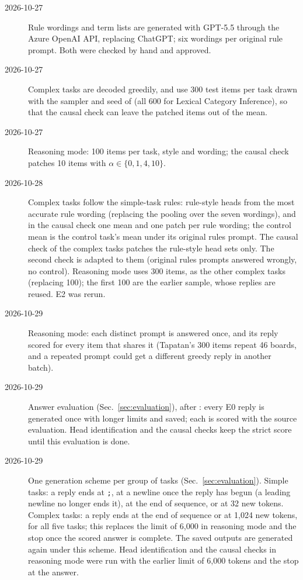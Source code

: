 \documentclass[11pt,a4paper]{article}
\begin{document}
\begin{description}
\item[2026-10-27] Rule wordings and term lists are generated with GPT-5.5 through the Azure OpenAI API, replacing ChatGPT; six wordings per original rule prompt. Both were checked by hand and approved.
\item[2026-10-27] Complex tasks are decoded greedily, and use 300 test items per task drawn with the sampler and seed of \citet{fu2026rules} (all 600 for Lexical Category Inference), so that the causal check can leave the patched items out of the mean.
\item[2026-10-27] Reasoning mode: 100 items per task, style and wording; the causal check patches 10 items with $\alpha\in\{0,1,4,10\}$.
\item[2026-10-28] Complex tasks follow the simple-task rules: rule-style heads from the most accurate rule wording (replacing the pooling over the seven wordings), and in the causal check one mean and one patch per rule wording; the control mean is the control task's mean under its original rules prompt. The causal check of the complex tasks patches the rule-style head sets only. The second check is adapted to them (original rules prompts answered wrongly, no control). Reasoning mode uses 300 items, as the other complex tasks (replacing 100); the first 100 are the earlier sample, whose replies are reused. E2 was rerun.
\item[2026-10-29] Reasoning mode: each distinct prompt is answered once, and its reply scored for every item that shares it (Tapatan's 300 items repeat 46 boards, and a repeated prompt could get a different greedy reply in another batch).
\item[2026-10-29] Answer evaluation (Sec.~\ref{sec:evaluation}), after \citet{hua2025flaw}: every E0 reply is generated once with longer limits and saved; each is scored with the source evaluation. Head identification and the causal checks keep the strict score until this evaluation is done.
\item[2026-10-29] One generation scheme per group of tasks (Sec.~\ref{sec:evaluation}). Simple tasks: a reply ends at \texttt{;}, at a newline once the reply has begun (a leading newline no longer ends it), at the end of sequence, or at 32 new tokens. Complex tasks: a reply ends at the end of sequence or at 1,024 new tokens, for all five tasks; this replaces the limit of 6,000 in reasoning mode and the stop once the scored answer is complete. The saved outputs are generated again under this scheme. Head identification and the causal checks in reasoning mode were run with the earlier limit of 6,000 tokens and the stop at the answer.

\end{description}
\end{document}
